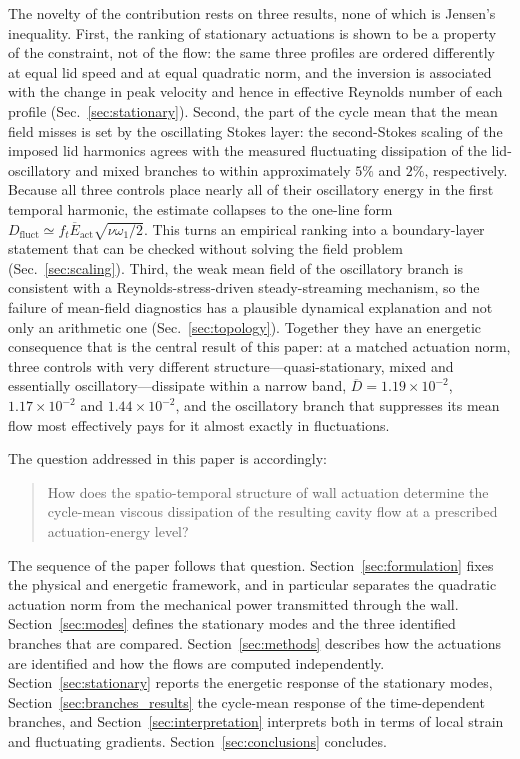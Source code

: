 \documentclass[11pt,a4paper]{article}
\begin{document}
The novelty of the contribution rests on three results, none of which is
Jensen's inequality. First, the ranking of stationary actuations is shown to be a
property of the constraint, not of the flow: the same three profiles are ordered
differently at equal lid speed and at equal quadratic norm, and the inversion is
associated with the change in peak velocity and hence in effective Reynolds number
of each profile (Sec.~\ref{sec:stationary}). Second, the part of the cycle mean
that the mean field misses is set by the oscillating Stokes layer: the
second-Stokes scaling of the imposed lid harmonics agrees with the measured
fluctuating dissipation of the lid-oscillatory and mixed branches to within
approximately $5\%$ and $2\%$, respectively. Because
all three controls place nearly all of their oscillatory energy in the first
temporal harmonic, the estimate collapses to the one-line form
$D_{\mathrm{fluct}}\simeq f_t\overline{E}_{\mathrm{act}}\sqrt{\nu\omega_1/2}$.
This turns an empirical ranking into a boundary-layer statement that can be
checked without solving the field problem (Sec.~\ref{sec:scaling}). Third, the weak
mean field of the oscillatory branch is
consistent with a Reynolds-stress-driven steady-streaming mechanism, so the failure
of mean-field diagnostics has a plausible dynamical explanation and not only an
arithmetic one (Sec.~\ref{sec:topology}).
Together they have an energetic consequence that is the central
result of this paper: at a matched actuation norm, three controls with very
different structure---quasi-stationary, mixed and essentially oscillatory---dissipate
within a narrow band, $\overline{D}=1.19\times10^{-2}$, $1.17\times10^{-2}$ and
$1.44\times10^{-2}$, and the oscillatory branch that suppresses its mean flow most
effectively pays for it almost exactly in fluctuations.

The question addressed in this paper is accordingly:
\begin{quote}
How does the spatio-temporal structure of wall actuation determine the cycle-mean
viscous dissipation of the resulting cavity flow at a prescribed
actuation-energy level?
\end{quote}
The sequence of the paper follows that question. Section~\ref{sec:formulation}
fixes the physical and energetic framework, and in particular separates the
quadratic actuation norm from the mechanical power transmitted through the wall.
Section~\ref{sec:modes} defines the stationary modes and the three identified
branches that are compared. Section~\ref{sec:methods} describes how the
actuations are identified and how the flows are computed independently.
Section~\ref{sec:stationary} reports the energetic response of the stationary
modes, Section~\ref{sec:branches_results} the cycle-mean response of the time-dependent
branches, and Section~\ref{sec:interpretation} interprets both in terms of local
strain and fluctuating gradients. Section~\ref{sec:conclusions} concludes.
\end{document}
